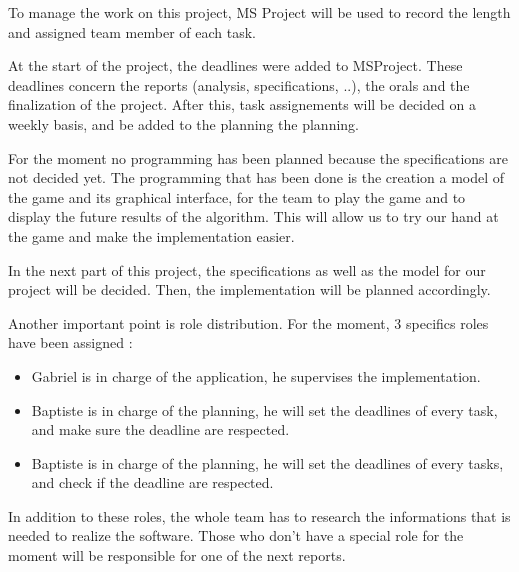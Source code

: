 To manage the work on this project, MS Project will be used to record the length and assigned team member of each task.
\newline

At the start of the project, the deadlines were added to MSProject. These deadlines concern the reports (analysis, specifications, ..), the orals and the finalization of the project. After this, task assignements will be decided on a weekly basis, and be added to the planning the planning.
\newline

For the moment no programming has been planned because the specifications are not decided yet. The programming that has been done is the creation a model of the game and its graphical interface, for the team to play the game and to display the future results of the algorithm. This will allow us to try our hand at the game and make the implementation easier.
\newline

In the next part of this project, the specifications as well as the model for our project will be decided. Then, the implementation will be planned accordingly.
\newline

Another important point is role distribution. For the moment, 3 specifics roles have been assigned : 
\begin{itemize}
\item Gabriel is in charge of the application, he supervises the implementation.
\item Baptiste is in charge of the planning, he will set the deadlines of every task, and make sure the deadline are respected.
\item Baptiste is in charge of the planning, he will set the deadlines of every tasks, and check if the deadline are respected.
\end{itemize}
In addition to these roles, the whole team has to research the informations that is needed to realize the software. Those who don't have a special role for the moment will be responsible for one of the next reports.